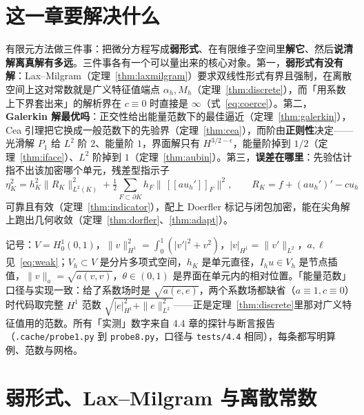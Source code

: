 

\section{这一章要解决什么}

有限元方法做三件事：把微分方程写成\textbf{弱形式}、在有限维子空间里\textbf{解它}、然后\textbf{说清解离真解有多远}。三件事各有一个可以量出来的核心对象。第一，\textbf{弱形式有没有解}：Lax--Milgram（定理~\ref{thm:laxmilgram}）要求双线性形式有界且强制，在离散空间上这对常数就是广义特征值端点 $\alpha_h,M_h$（定理~\ref{thm:discrete}），而「用系数上下界套出来」的解析界在
$c\equiv0$ 时直接是 $\infty$（式~\eqref{eq:coerce}）。第二，\textbf{Galerkin
解最优吗}：正交性给出能量范数下的最佳逼近（定理~\ref{thm:galerkin}），Cea
引理把它换成一般范数下的先验界（定理~\ref{thm:cea}），而阶由\textbf{正则性}决定——光滑解 $P_1$ 给 $L^2$ 阶 $2$、能量阶 $1$，界面解只有
$H^{3/2-\epsilon}$，能量阶掉到 $1/2$（定理~\ref{thm:iface}）、$L^2$ 阶掉到
$1$（定理~\ref{thm:aubin}）。第三，\textbf{误差在哪里}：先验估计指不出该加密哪个单元，残差型指示子
\begin{equation}
  \eta_K^2=h_K^2\|R_K\|_{L^2(K)}^2+\tfrac12\sum_{F\subset\partial K}h_F
  \|\,[\![au_h']\!]_F\|^2,\qquad R_K=f+(au_h')'-cu_h
  \label{eq:indicator}
\end{equation}
可靠且有效（定理~\ref{thm:indicator}），配上 Doerfler
标记与闭包加密，能在尖角解上跑出几何收敛（定理~\ref{thm:dorfler}、\ref{thm:adapt}）。

记号：$V=H^1_0(0,1)$，$\|v\|_{H^1}^2=\int_0^1(|v'|^2+v^2)$，$|v|_{H^1}=\|v'\|_{L^2}$，$a,\ell$
见~\eqref{eq:weak}；$V_h\subset V$ 是分片多项式空间，$h_K$ 是单元直径，$I_hu\in V_h$
是节点插值，$\|v\|_a=\sqrt{a(v,v)}$，$\theta\in(0,1)$ 是界面在单元内的相对位置。「能量范数」口径与实现一致：给了系数场时是
$\sqrt{a(e,e)}$，两个系数场都缺省（$a\equiv1,c\equiv0$）时代码取完整 $H^1$ 范数
$\sqrt{|e|_{H^1}^2+\|e\|_{L^2}^2}$——正是定理~\ref{thm:discrete}里那对广义特征值用的范数。所有「实测」数字来自 4.4
章的探针与断言报告（\texttt{.cache/probe1.py} 到 \texttt{probe8.py}，口径与 \texttt{tests/4.4}
相同），每条都写明算例、范数与网格。

\section{弱形式、Lax--Milgram 与离散常数}

